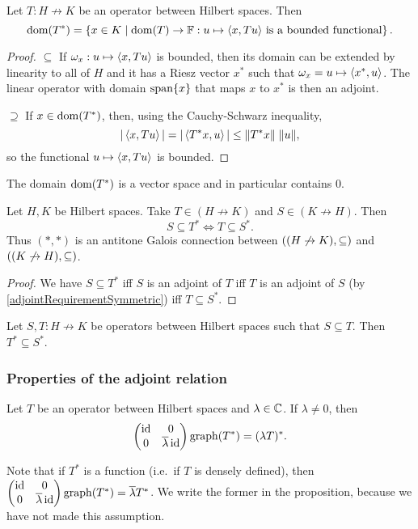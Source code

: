 \begin{proposition} \label{adjointDomain}
Let $T: H\not\to K$ be an operator between Hilbert spaces. Then
\[ \operatorname{dom}(T^*) = \left\{ x\in K \;\middle|\; \text{$\operatorname{dom}(T)\to \mathbb{F}: u\mapsto \left\langle x, Tu \right\rangle$ is a bounded functional} \right\}. \]
\end{proposition}
\begin{proof}
$\boxed{\subseteq}$ If $\omega_x: u\mapsto \left\langle x, Tu \right\rangle$ is bounded, then its domain can be extended by linearity to all of $H$ and it has a Riesz vector $x^*$ such that $\omega_x = u\mapsto \left\langle x^*, u \right\rangle$. The linear operator with domain $\operatorname{span}\{x\}$ that maps $x$ to $x^*$ is then an adjoint.

$\boxed{\supseteq}$ If $x\in\operatorname{dom}(T^*)$, then, using the Cauchy-Schwarz inequality,
\[ |\left\langle x,Tu \right\rangle| = |\left\langle T^*x,u \right\rangle| \leq \lVert T^*x\rVert\;\lVert u\rVert, \]
so the functional $u\mapsto \left\langle x, Tu \right\rangle$ is bounded.
\end{proof}
\begin{corollary}
The domain $\operatorname{dom}(T^*)$ is a vector space and in particular contains $0$.
\end{corollary}

\begin{proposition} \label{HilbertAdjointGaloisConnection}
Let $H, K$ be Hilbert spaces. Take $T\in (H\not\to K)$ and $S\in (K\not\to H)$. Then
\[ S \subseteq T^* \iff T\subseteq S^*. \]
Thus $(*,*)$ is an antitone Galois connection between $\left( (H\not\to K), \subseteq \right)$ and $\left( (K\not\to H), \subseteq \right)$.
\end{proposition}
\begin{proof}
We have $S \subseteq T^*$ iff $S$ is an adjoint of $T$ iff $T$ is an adjoint of $S$ (by \ref{adjointRequirementSymmetric}) iff $T\subseteq S^*$.
\end{proof}
\begin{corollary} \label{HilbertAdjointAntitone}
Let $S,T: H\not\to K$ be operators between Hilbert spaces such that $S\subseteq T$. Then $T^* \subseteq S^*$.
\end{corollary}
\subsubsection{Properties of the adjoint relation}

\begin{proposition}
Let $T$ be an operator between Hilbert spaces and $\lambda\in\mathbb{C}$. If $\lambda \neq 0$, then
\[ \begin{pmatrix}
\operatorname{id} & 0 \\ 0 & \overline{\lambda}\operatorname{id}
\end{pmatrix} \operatorname{graph}(T^*) = (\lambda T)^*. \]
\end{proposition}
Note that if $T^*$ is a function (i.e.\ if $T$ is densely defined), then $\begin{pmatrix}
\operatorname{id} & 0 \\ 0 & \overline{\lambda}\operatorname{id}
\end{pmatrix} \operatorname{graph}(T^*) = \overline{\lambda}T^*$. We write the former in the proposition, because we have not made this assumption.

